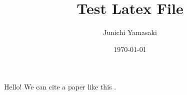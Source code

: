 \documentclass{article} %
\title{Test Latex File}  %
\author{Junichi Yamasaki} %
\date{\today} %
\begin{document}
\maketitle %


Hello! We can cite a paper like this \citep{angrist_identification_1996}.



\end{document}
